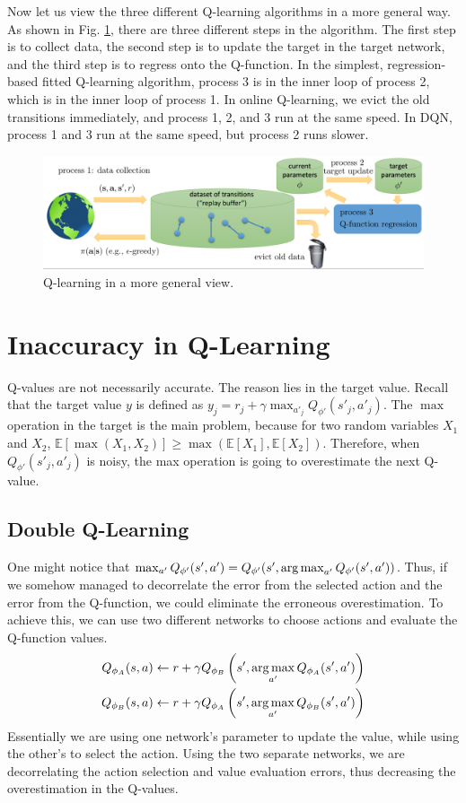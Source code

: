 Now let us view the three different Q-learning algorithms in a more general way. As shown in Fig. \ref{fig:dqn}, there are three different steps in the algorithm. The first step is to collect data, the second step is to update the target in the target network, and the third step is to regress onto the Q-function. In the simplest, regression-based fitted Q-learning algorithm, process 3 is in the inner loop of process 2, which is in the inner loop of process 1. In online Q-learning, we evict the old transitions immediately, and process 1, 2, and 3 run at the same speed. In DQN, process 1 and 3 run at the same speed, but process 2 runs slower.
\begin{figure}
    \centering
    \includegraphics[scale=0.5]{figures/dqn.png}
    \caption{Q-learning in a more general view.}
    \label{fig:dqn}
\end{figure}

\section{Inaccuracy in Q-Learning}
Q-values are not necessarily accurate. The reason lies in the target value. Recall that the target value $y$ is defined as $y_j = r_j + \gamma \max_{a'_j}Q_{\phi'}(s'_j,a'_j)$. The $\max$ operation in the target is the main problem, because for two random variables $X_1$ and $X_2$, $\mathbb{E}[\max(X_1,X_2)] \geq \max(\mathbb{E}[X_1],\mathbb{E}[X_2])$. Therefore, when $Q_{\phi'}(s'_j,a'_j)$ is noisy, the max operation is going to overestimate the next Q-value.

\subsection{Double Q-Learning}
One might notice that $\max_{a'}Q_{\phi'}(s',a') = Q_{\phi'}(s',\operatorname*{arg\,max}_{a'}Q_{\phi'}(s',a'))$. Thus, if we somehow managed to decorrelate the error from the selected action and the error from the Q-function, we could eliminate the erroneous overestimation. To achieve this, we can use two different networks to choose actions and evaluate the Q-function values. 
\begin{align*}
    Q_{\phi_A}(s,a) &\leftarrow r + \gamma Q_{\phi_B}\left(s',\operatorname*{arg\,max}_{a'}Q_{\phi_A}(s',a')\right)\\
    Q_{\phi_B}(s,a) &\leftarrow r + \gamma Q_{\phi_A}\left(s',\operatorname*{arg\,max}_{a'}Q_{\phi_B}(s',a')\right)
\end{align*}
Essentially we are using one network's parameter to update the value, while using the other's to select the action. Using the two separate networks, we are decorrelating the action selection and value evaluation errors, thus decreasing the overestimation in the Q-values.

